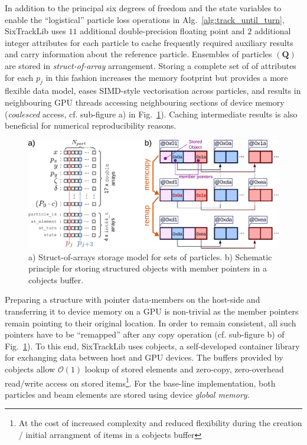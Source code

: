 \documentclass[a4paper,
               refpage,       %
               keeplastbox,   %
               ]{jacow}
\begin{document}
In addition to the principal six degrees of freedom and the state variables to enable the ``logistical'' particle loss operations in Alg.~\ref{alg:track_until_turn}, SixTrackLib uses $11$ additional double-precision floating point and $2$ additional integer attributes for each particle to cache frequently required auxiliary results and carry information about the reference particle. Ensembles of particles $\left(\mathbf{Q}\right)$ are stored in \textit{struct-of-array} arrangement. Storing a  complete set of of attributes for each $p_j$ in this fashion increases the memory footprint but provides a more flexible data model, eases SIMD-style vectorisation across particles, and results in neighbouring GPU threads accessing neighbouring sections of device memory (\textit{coalesced} access, cf. sub-figure a) in Fig.~\ref{fig:cobjects}). Caching intermediate results is also beneficial for numerical reproducibility reasons.
\begin{figure}[!hbt]
    \centering
    \includegraphics*[width=.95\columnwidth]{fig_cobjects}
    \caption{a) Struct-of-arrays storage model for sets of particles. b) Schematic principle for storing structured objects with member pointers in a cobjects buffer.}
    \label{fig:cobjects}
\end{figure}
Preparing a structure with pointer data-members on the host-side and transferring it to device memory on a GPU is non-trivial as the member pointers remain pointing to their original location. In order to remain consistent, all such pointers have to be ``remapped'' after any copy operation (cf. sub-figure b) of Fig.~\ref{fig:cobjects}). To this end, SixTrackLib uses cobjects\cite{cobjects-repo-2021}, a self-developed container library for exchanging data between host and GPU devices. The buffers provided by cobjects allow $\mathcal{O}(1)$ lookup of stored elements and zero-copy, zero-overhead read/write access on stored items\footnote{At the cost of increased complexity and reduced flexibility during the creation / initial arrangment of items in a cobjects buffer}. For the base-line implementation, both particles and beam elements are stored using device \textit{global memory}.
\end{document}

